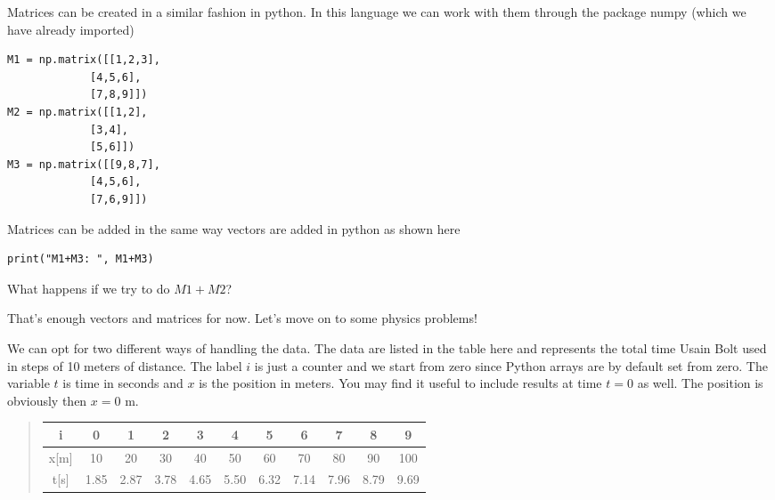 \documentclass[%
oneside,                 %
final,                   %
10pt]{article}
\begin{document}
Matrices can be created in a similar fashion in python.  In this
language we can work with them through the package numpy (which we
have already imported)











\begin{verbatim}
M1 = np.matrix([[1,2,3],
             [4,5,6],
             [7,8,9]])
M2 = np.matrix([[1,2],
             [3,4],
             [5,6]])
M3 = np.matrix([[9,8,7],
             [4,5,6],
             [7,6,9]])

\end{verbatim}


Matrices can be added in the same way vectors are added in python as shown here


\begin{verbatim}
print("M1+M3: ", M1+M3)

\end{verbatim}

What happens if we try to do $M1+M2$?

That's enough vectors and matrices for now. Let's move on to some physics problems! 

We can opt for two different ways of handling the data. The data are
listed in the table here and represents the total time Usain Bolt used
in steps of 10 meters of distance. The label $i$ is just a counter and
we start from zero since Python arrays are by default set from
zero. The variable $t$ is time in seconds and $x$ is the position in
meters. You may find it useful to include results at time $t=0$ as well. The position is obviously then $x=0$ m.


\begin{quote}
\begin{tabular}{ccccccccccc}
\hline
\multicolumn{1}{c}{ i } & \multicolumn{1}{c}{ 0 } & \multicolumn{1}{c}{ 1 } & \multicolumn{1}{c}{ 2 } & \multicolumn{1}{c}{ 3 } & \multicolumn{1}{c}{ 4 } & \multicolumn{1}{c}{ 5 } & \multicolumn{1}{c}{ 6 } & \multicolumn{1}{c}{ 7 } & \multicolumn{1}{c}{ 8 } & \multicolumn{1}{c}{ 9 } \\
\hline
x[m] & 10   & 20   & 30   & 40   & 50   & 60   & 70   & 80   & 90   & 100  \\
\hline
t[s] & 1.85 & 2.87 & 3.78 & 4.65 & 5.50 & 6.32 & 7.14 & 7.96 & 8.79 & 9.69 \\
\hline
\end{tabular}
\end{quote}
\end{document}
